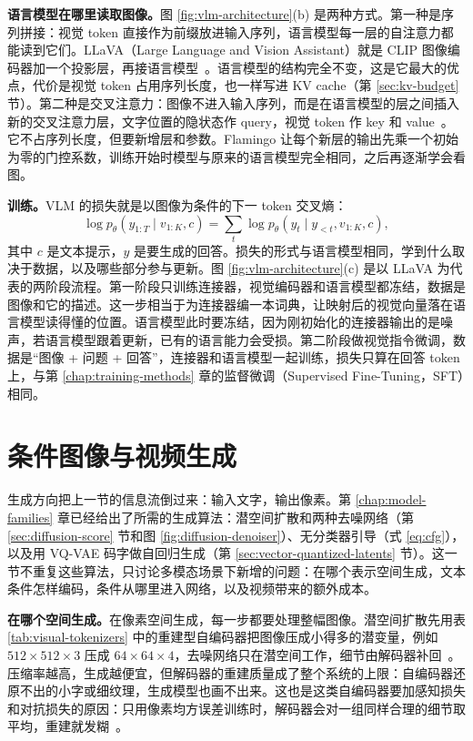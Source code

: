 \textbf{语言模型在哪里读取图像。}图 \ref{fig:vlm-architecture}(b) 是两种方式。第一种是序列拼接：视觉 token 直接作为前缀放进输入序列，语言模型每一层的自注意力都能读到它们。LLaVA（Large Language and Vision Assistant）就是 CLIP 图像编码器加一个投影层，再接语言模型~\cite{liu2023llava}。语言模型的结构完全不变，这是它最大的优点，代价是视觉 token 占用序列长度，也一样写进 KV cache（第 \ref{sec:kv-budget} 节）。第二种是交叉注意力：图像不进入输入序列，而是在语言模型的层之间插入新的交叉注意力层，文字位置的隐状态作 query，视觉 token 作 key 和 value~\cite{alayrac2022flamingo}。它不占序列长度，但要新增层和参数。Flamingo 让每个新层的输出先乘一个初始为零的门控系数，训练开始时模型与原来的语言模型完全相同，之后再逐渐学会看图。

\textbf{训练。}VLM 的损失就是以图像为条件的下一 token 交叉熵：
\begin{equation}
\log p_\theta(y_{1:T}\mid v_{1:K},c)
=\sum_t\log p_\theta(y_t\mid y_{<t},v_{1:K},c),
\end{equation}
其中 \(c\) 是文本提示，\(y\) 是要生成的回答。损失的形式与语言模型相同，学到什么取决于数据，以及哪些部分参与更新。图 \ref{fig:vlm-architecture}(c) 是以 LLaVA 为代表的两阶段流程。第一阶段只训练连接器，视觉编码器和语言模型都冻结，数据是图像和它的描述。这一步相当于为连接器编一本词典，让映射后的视觉向量落在语言模型读得懂的位置。语言模型此时要冻结，因为刚初始化的连接器输出的是噪声，若语言模型跟着更新，已有的语言能力会受损。第二阶段做视觉指令微调，数据是“图像 + 问题 + 回答”，连接器和语言模型一起训练，损失只算在回答 token 上，与第 \ref{chap:training-methods} 章的监督微调（Supervised Fine-Tuning，SFT）相同。

\section{条件图像与视频生成}
\label{sec:conditional-generation}

生成方向把上一节的信息流倒过来：输入文字，输出像素。第 \ref{chap:model-families} 章已经给出了所需的生成算法：潜空间扩散和两种去噪网络（第 \ref{sec:diffusion-score} 节和图 \ref{fig:diffusion-denoiser}）、无分类器引导（式 \eqref{eq:cfg}），以及用 VQ-VAE 码字做自回归生成（第 \ref{sec:vector-quantized-latents} 节）。这一节不重复这些算法，只讨论多模态场景下新增的问题：在哪个表示空间生成，文本条件怎样编码，条件从哪里进入网络，以及视频带来的额外成本。

\textbf{在哪个空间生成。}在像素空间生成，每一步都要处理整幅图像。潜空间扩散先用表 \ref{tab:visual-tokenizers} 中的重建型自编码器把图像压成小得多的潜变量，例如 \(512\times512\times3\) 压成 \(64\times64\times4\)，去噪网络只在潜空间工作，细节由解码器补回~\cite{rombach2022ldm}。压缩率越高，生成越便宜，但解码器的重建质量成了整个系统的上限：自编码器还原不出的小字或细纹理，生成模型也画不出来。这也是这类自编码器要加感知损失和对抗损失的原因：只用像素均方误差训练时，解码器会对一组同样合理的细节取平均，重建就发糊~\cite{esser2021vqgan}。

